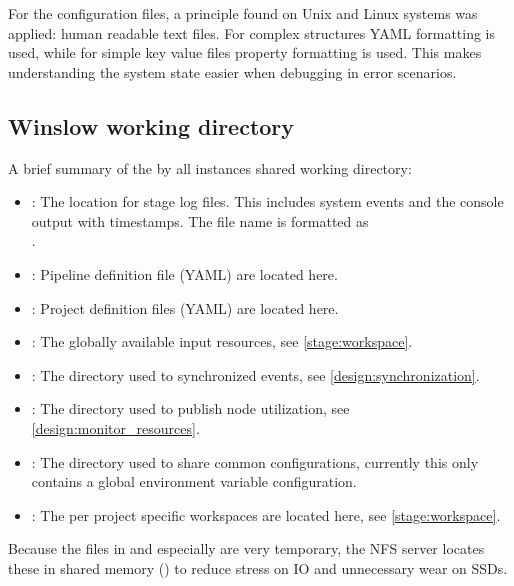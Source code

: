 For the configuration files, a principle found on Unix and Linux systems was applied: human readable text files.
For complex structures YAML formatting is used, while for simple key value files property formatting is used.
This makes understanding the system state easier when debugging in error scenarios.

\subsection{Winslow working directory}
\label{design:winslow:workdir}

A brief summary of the by all instances shared working directory:

\begin{itemize}
	\item {}: The location for stage log files.
	This includes system events and the console output with timestamps.
	The file name is formatted as \\
	.
	\item {}: Pipeline definition file (YAML) are located here.
	\item {}: Project definition files (YAML) are located here.
	\item {}: The globally available input resources, see \autoref{stage:workspace}.
	\item {}: The directory used to synchronized events, see \autoref{design:synchronization}.
	\item {}: The directory used to publish node utilization, see \autoref{design:monitor_resources}.
	\item {}: The directory used to share common configurations, currently this only contains a global environment variable configuration.
	\item {}: The per project specific workspaces are located here, see \autoref{stage:workspace}.
\end{itemize}

Because the files in  and especially  are very temporary, the NFS server locates these in shared memory () to reduce stress on IO and unnecessary wear on SSDs.

